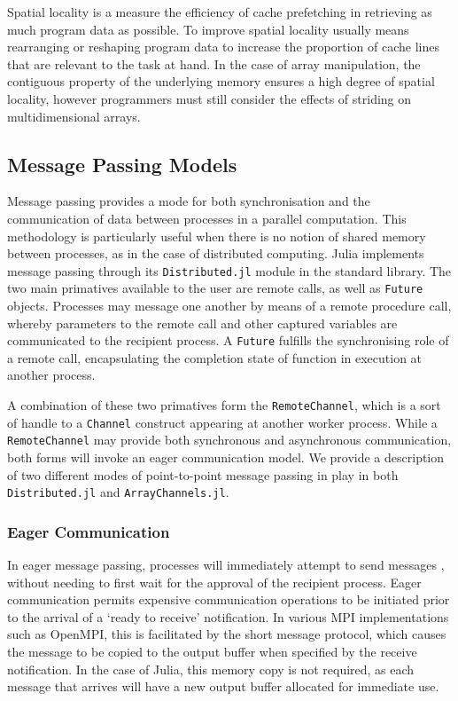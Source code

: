 Spatial locality is a measure the efficiency of cache prefetching in
retrieving as much program data as possible. To improve spatial locality
usually means rearranging or reshaping program data to increase the
proportion of cache lines that are relevant to the task at hand. In the
case of array manipulation, the contiguous property of the underlying
memory ensures a high degree of spatial locality, however programmers
must still consider the effects of striding on multidimensional arrays.

\subsection{Message Passing Models}
\label{sec:message-passing}

Message passing provides a mode for both synchronisation and the
communication of data between processes in a parallel computation. This
methodology is particularly useful when there is no notion of shared
memory between processes, as in the case of distributed computing. Julia
implements message passing through its \texttt{Distributed.jl} module in
the standard library. The two main primatives available to the user are
remote calls, as well as \texttt{Future} objects. Processes may message
one another by means of a remote procedure call, whereby parameters to
the remote call and other captured variables are communicated to the
recipient process. A \texttt{Future} fulfills the synchronising role of
a remote call, encapsulating the completion state of function in
execution at another process.

A combination of these two primatives form the \texttt{RemoteChannel},
which is a sort of handle to a \texttt{Channel} construct appearing at
another worker process. While a \texttt{RemoteChannel} may provide both
synchronous and asynchronous communication, both forms will invoke an
eager communication model. We provide a description of two different
modes of point-to-point message passing in play in both
\texttt{Distributed.jl} and \texttt{ArrayChannels.jl}.

\subsubsection{Eager Communication}
\label{sec:eager}

In eager message passing, processes will immediately attempt to send
messages \cite{illinois, ompi}, without needing to first wait for the
approval of the recipient process. Eager communication permits expensive
communication operations to be initiated prior to the arrival of a
`ready to receive' notification. In various MPI implementations such as
OpenMPI, this is facilitated by the short message protocol, which causes
the message to be copied to the output buffer when specified by the
receive notification. In the case of Julia, this memory copy is not
required, as each message that arrives will have a new output buffer
allocated for immediate use.

